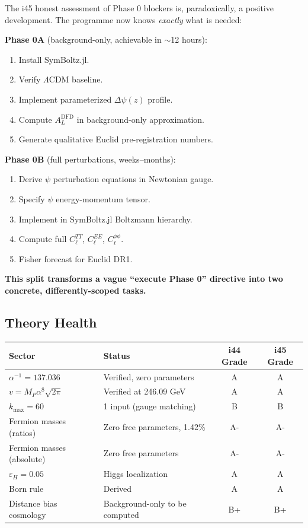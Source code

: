 \documentclass[11pt,a4paper]{article}
\begin{document}
\begin{tcolorbox}[colback=green!5!white, colframe=green!60!black,
  title={Phase 0A/0B Split: A Genuine Advance in Understanding}]

The i45 honest assessment of Phase 0 blockers is, paradoxically, a positive development. The programme now knows \emph{exactly} what is needed:

\textbf{Phase 0A} (background-only, achievable in $\sim$12 hours):
\begin{enumerate}
\item Install SymBoltz.jl.
\item Verify $\Lambda$CDM baseline.
\item Implement parameterized $\Delta\psi(z)$ profile.
\item Compute $A_L^{\text{DFD}}$ in background-only approximation.
\item Generate qualitative Euclid pre-registration numbers.
\end{enumerate}

\textbf{Phase 0B} (full perturbations, weeks--months):
\begin{enumerate}
\item Derive $\psi$ perturbation equations in Newtonian gauge.
\item Specify $\psi$ energy-momentum tensor.
\item Implement in SymBoltz.jl Boltzmann hierarchy.
\item Compute full $C_\ell^{TT}$, $C_\ell^{EE}$, $C_\ell^{\phi\phi}$.
\item Fisher forecast for Euclid DR1.
\end{enumerate}

\textbf{This split transforms a vague ``execute Phase 0'' directive into two concrete, differently-scoped tasks.}
\end{tcolorbox}

\subsection{Theory Health}

\begin{center}
\begin{tabular}{llcc}
\toprule
\textbf{Sector} & \textbf{Status} & \textbf{i44 Grade} & \textbf{i45 Grade} \\
\midrule
$\alpha^{-1} = 137.036$ & Verified, zero parameters & A & A \\
$v = M_P \alpha^8 \sqrt{2\pi}$ & Verified at 246.09 GeV & A & A \\
$k_{\max} = 60$ & 1 input (gauge matching) & B & B \\
Fermion masses (ratios) & Zero free parameters, 1.42\% & A- & A- \\
Fermion masses (absolute) & Zero free parameters & A- & A- \\
$\varepsilon_H = 0.05$ & Higgs localization & A & A \\
Born rule & Derived & A & A \\
Distance bias cosmology & Background-only to be computed & B+ & B+ \\
\bottomrule
\end{tabular}
\end{center}
\end{document}
